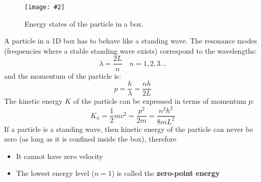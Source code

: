 \documentclass[11pt]{article}
\newcommand{\pic}[2]{\texttt{[image: \#2]}}
\begin{document}
\begin{wrapfigure}{l}{.3\textwidth}
  \pic{.3}{../box.png}
  \caption{Energy states of the particle in a box.}
  \label{fig:1d-box}
\end{wrapfigure}
A particle in a 1D box has to behave like a standing wave. The resonance modes
(frequencies where a stable standing wave exists) correspond to the wavelengths:
\begin{equation}
  \lambda=\frac{2L}{n}\quad n=1,2,3\ldots
\end{equation}
and the momentum of the particle is:
\begin{equation}
  p=\frac{h}{\lambda}=\frac{nh}{2L}
\end{equation}
%  
%
%
%
%
%  
%    
The kinetic energy $K$ of the particle can be expressed in terms of momentum
$p$:
\begin{equation}
  K_n=\frac{1}{2}mv^2=\frac{p^2}{2m}=\frac{n^2h^2}{8mL^2}
\end{equation}
If a particle is a standing wave, then kinetic energy of the particle can never
be zero (as long as it is confined inside the box), therefore
\begin{itemize}[noitemsep,topsep=0pt]
\item It cannot have zero velocity
\item The lowest energy level ($n=1$) is called the \textbf{zero-point energy}
\end{itemize}
%  
%
%
%
%
%
%
\end{document}
